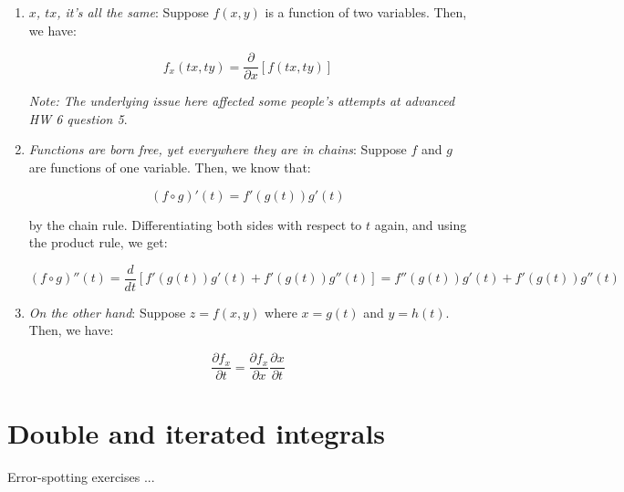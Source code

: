 \documentclass[10pt]{amsart}
\begin{document}
\begin{enumerate}
\item {\em $x$, $tx$, it's all the same}: Suppose $f(x,y)$ is a
  function of two variables. Then, we have:

  $$f_x(tx,ty) = \frac{\partial}{\partial x}[f(tx,ty)]$$

  {\em Note: The underlying issue here affected some people's attempts
  at advanced HW 6 question 5}.
\item {\em Functions are born free, yet everywhere they are in
  chains}: Suppose $f$ and $g$ are functions of one variable. Then, we
  know that:

  $$(f \circ g)'(t) = f'(g(t))g'(t)$$

  by the chain rule. Differentiating both sides with respect to $t$
  again, and using the product rule, we get:

  $$(f \circ g)''(t) = \frac{d}{dt}\left[f'(g(t))g'(t) + f'(g(t))g''(t)\right] = f''(g(t))g'(t) + f'(g(t))g''(t)$$

\item {\em On the other hand}: Suppose $z = f(x,y)$ where $x = g(t)$ and
$y = h(t)$. Then, we have:

  $$\frac{\partial f_x}{\partial t} = \frac{\partial f_x}{\partial x}\frac{\partial x}{\partial t}$$
\end{enumerate}

\section{Double and iterated integrals}

Error-spotting exercises ...
\end{document}
